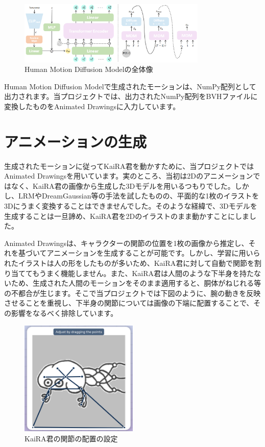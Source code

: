 \begin{figure}[htbp]
    \centering
    \includegraphics[width=0.8\textwidth]{moving-kaira-kun/fig/hdm_overview.png}
    \caption{Human Motion Diffusion Modelの全体像}
    \label{fig:hdm_overview}
\end{figure}

Human Motion Diffusion Modelで生成されたモーションは、NumPy配列として出力されます。当プロジェクトでは、出力されたNumPy配列をBVHファイルに変換したものをAnimated Drawingsに入力しています。

\section{アニメーションの生成}

生成されたモーションに従ってKaiRA君を動かすために、当プロジェクトではAnimated Drawings\cite{smith2023methodanimatingchildrensdrawings}を用いています。実のところ、当初は2Dのアニメーションではなく、KaiRA君の画像から生成した3Dモデルを用いるつもりでした。しかし、LRM\cite{hong2024lrmlargereconstructionmodel}やDreamGaussian\cite{tang2024dreamgaussiangenerativegaussiansplatting}等の手法を試したものの、平面的な1枚のイラストを3Dにうまく変換することはできませんでした。そのような経緯で、3Dモデルを生成することは一旦諦め、KaiRA君を2Dのイラストのまま動かすことにしました。

Animated Drawingsは、キャラクターの関節の位置を1枚の画像から推定し、それを基づいてアニメーションを生成することが可能です。しかし、学習に用いられたイラストは人の形をしたものが多いため、KaiRA君に対して自動で関節を割り当ててもうまく機能しません。また、KaiRA君は人間のような下半身を持たないため、生成された人間のモーションをそのまま適用すると、胴体がねじれる等の不都合が生じます。そこで当プロジェクトでは下図のように、腕の動きを反映させることを重視し、下半身の関節については画像の下端に配置することで、その影響をなるべく排除しています。

\begin{figure}[htbp]
    \centering
    \includegraphics[width=0.5\textwidth]{moving-kaira-kun/fig/kaira_kun_animated_drawings.png}
    \caption{KaiRA君の関節の配置の設定}
    \label{fig:kaira_kun_animated}
\end{figure}

